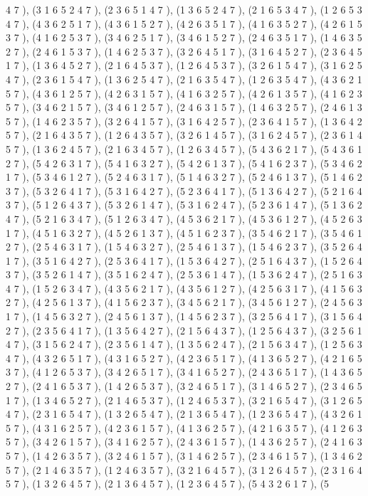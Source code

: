 \documentclass[12pt]{article}
\begin{document}
\begin{enumerate}
4 7  ), (3 1 6 5 2 4 7  ), (2 3 6 5 1 4 7  ), (1 3 6 5 2 4 7  ), (2 1 6 5 3 4 7  ), (1 2 6 5 3 4 7  ), (4 3 6 2 5 1 7  ), (4 3 6 1 5 2 7  ), (4 2 6 3 5 1 7  ), (4 1 6 3 5 2 7  ), (4 2 6 1 5 3 7  ), (4 1 6 2 5 3 7  ), (3 4 6 2 5 1 7  ), (3 4 6 1 5 2 7  ), (2 4 6 3 5 1 7  ), (1 4 6 3 5 2 7  ), (2 4 6 1 5 3 7  ), (1 4 6 2 5 3 7  ), (3 2 6 4 5 1 7  ), (3 1 6 4 5 2 7  ), (2 3 6 4 5 1 7  ), (1 3 6 4 5 2 7  ), (2 1 6 4 5 3 7  ), (1 2 6 4 5 3 7  ), (3 2 6 1 5 4 7  ), (3 1 6 2 5 4 7  ), (2 3 6 1 5 4 7  ), (1 3 6 2 5 4 7  ), (2 1 6 3 5 4 7  ), (1 2 6 3 5 4 7  ), (4 3 6 2 1 5 7  ), (4 3 6 1 2 5 7  ), (4 2 6 3 1 5 7  ), (4 1 6 3 2 5 7  ), (4 2 6 1 3 5 7  ), (4 1 6 2 3 5 7  ), (3 4 6 2 1 5 7  ), (3 4 6 1 2 5 7  ), (2 4 6 3 1 5 7  ), (1 4 6 3 2 5 7  ), (2 4 6 1 3 5 7  ), (1 4 6 2 3 5 7  ), (3 2 6 4 1 5 7  ), (3 1 6 4 2 5 7  ), (2 3 6 4 1 5 7  ), (1 3 6 4 2 5 7  ), (2 1 6 4 3 5 7  ), (1 2 6 4 3 5 7  ), (3 2 6 1 4 5 7  ), (3 1 6 2 4 5 7  ), (2 3 6 1 4 5 7  ), (1 3 6 2 4 5 7  ), (2 1 6 3 4 5 7  ), (1 2 6 3 4 5 7  ), (5 4 3 6 2 1 7  ), (5 4 3 6 1 2 7  ), (5 4 2 6 3 1 7  ), (5 4 1 6 3 2 7  ), (5 4 2 6 1 3 7  ), (5 4 1 6 2 3 7  ), (5 3 4 6 2 1 7  ), (5 3 4 6 1 2 7  ), (5 2 4 6 3 1 7  ), (5 1 4 6 3 2 7  ), (5 2 4 6 1 3 7  ), (5 1 4 6 2 3 7  ), (5 3 2 6 4 1 7  ), (5 3 1 6 4 2 7  ), (5 2 3 6 4 1 7  ), (5 1 3 6 4 2 7  ), (5 2 1 6 4 3 7  ), (5 1 2 6 4 3 7  ), (5 3 2 6 1 4 7  ), (5 3 1 6 2 4 7  ), (5 2 3 6 1 4 7  ), (5 1 3 6 2 4 7  ), (5 2 1 6 3 4 7  ), (5 1 2 6 3 4 7  ), (4 5 3 6 2 1 7  ), (4 5 3 6 1 2 7  ), (4 5 2 6 3 1 7  ), (4 5 1 6 3 2 7  ), (4 5 2 6 1 3 7  ), (4 5 1 6 2 3 7  ), (3 5 4 6 2 1 7  ), (3 5 4 6 1 2 7  ), (2 5 4 6 3 1 7  ), (1 5 4 6 3 2 7  ), (2 5 4 6 1 3 7  ), (1 5 4 6 2 3 7  ), (3 5 2 6 4 1 7  ), (3 5 1 6 4 2 7  ), (2 5 3 6 4 1 7  ), (1 5 3 6 4 2 7  ), (2 5 1 6 4 3 7  ), (1 5 2 6 4 3 7  ), (3 5 2 6 1 4 7  ), (3 5 1 6 2 4 7  ), (2 5 3 6 1 4 7  ), (1 5 3 6 2 4 7  ), (2 5 1 6 3 4 7  ), (1 5 2 6 3 4 7  ), (4 3 5 6 2 1 7  ), (4 3 5 6 1 2 7  ), (4 2 5 6 3 1 7  ), (4 1 5 6 3 2 7  ), (4 2 5 6 1 3 7  ), (4 1 5 6 2 3 7  ), (3 4 5 6 2 1 7  ), (3 4 5 6 1 2 7  ), (2 4 5 6 3 1 7  ), (1 4 5 6 3 2 7  ), (2 4 5 6 1 3 7  ), (1 4 5 6 2 3 7  ), (3 2 5 6 4 1 7  ), (3 1 5 6 4 2 7  ), (2 3 5 6 4 1 7  ), (1 3 5 6 4 2 7  ), (2 1 5 6 4 3 7  ), (1 2 5 6 4 3 7  ), (3 2 5 6 1 4 7  ), (3 1 5 6 2 4 7  ), (2 3 5 6 1 4 7  ), (1 3 5 6 2 4 7  ), (2 1 5 6 3 4 7  ), (1 2 5 6 3 4 7  ), (4 3 2 6 5 1 7  ), (4 3 1 6 5 2 7  ), (4 2 3 6 5 1 7  ), (4 1 3 6 5 2 7  ), (4 2 1 6 5 3 7  ), (4 1 2 6 5 3 7  ), (3 4 2 6 5 1 7  ), (3 4 1 6 5 2 7  ), (2 4 3 6 5 1 7  ), (1 4 3 6 5 2 7  ), (2 4 1 6 5 3 7  ), (1 4 2 6 5 3 7  ), (3 2 4 6 5 1 7  ), (3 1 4 6 5 2 7  ), (2 3 4 6 5 1 7  ), (1 3 4 6 5 2 7  ), (2 1 4 6 5 3 7  ), (1 2 4 6 5 3 7  ), (3 2 1 6 5 4 7  ), (3 1 2 6 5 4 7  ), (2 3 1 6 5 4 7  ), (1 3 2 6 5 4 7  ), (2 1 3 6 5 4 7  ), (1 2 3 6 5 4 7  ), (4 3 2 6 1 5 7  ), (4 3 1 6 2 5 7  ), (4 2 3 6 1 5 7  ), (4 1 3 6 2 5 7  ), (4 2 1 6 3 5 7  ), (4 1 2 6 3 5 7  ), (3 4 2 6 1 5 7  ), (3 4 1 6 2 5 7  ), (2 4 3 6 1 5 7  ), (1 4 3 6 2 5 7  ), (2 4 1 6 3 5 7  ), (1 4 2 6 3 5 7  ), (3 2 4 6 1 5 7  ), (3 1 4 6 2 5 7  ), (2 3 4 6 1 5 7  ), (1 3 4 6 2 5 7  ), (2 1 4 6 3 5 7  ), (1 2 4 6 3 5 7  ), (3 2 1 6 4 5 7  ), (3 1 2 6 4 5 7  ), (2 3 1 6 4 5 7  ), (1 3 2 6 4 5 7  ), (2 1 3 6 4 5 7  ), (1 2 3 6 4 5 7  ), (5 4 3 2 6 1 7  ), (5 
\end{enumerate}
\end{document}
